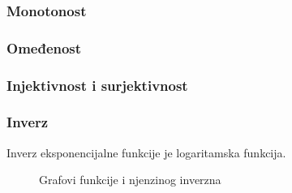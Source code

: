 \subsubsection{Monotonost \loga}
\subsubsection{Omeđenost \loga}
\subsubsection{Injektivnost i surjektivnost \loga}
\subsubsection{Inverz \loga}
Inverz eksponencijalne funkcije je logaritamska funkcija.
    \begin{figure}[ht]
        \centering
        \caption{Grafovi funkcije i njenzinog inverzna}
        \label{fig:template}
    \end{figure}
    \\